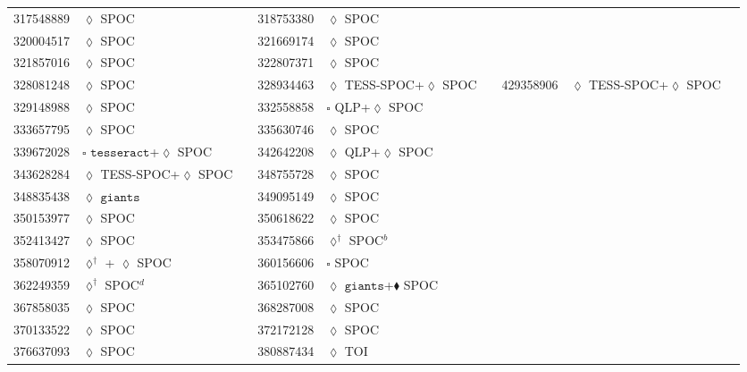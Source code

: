 \begin{longtable}{llrllr}
317548889 & $\lozenge$ SPOC & \cite{TIC_232540264} & 318753380 & $\lozenge$ SPOC & \cite{TIC_428699140} \\
320004517 & $\lozenge$ SPOC & \cite{TIC_320004517} & 321669174 & $\lozenge$ SPOC & \cite{TIC_126606859} \\
321857016 & $\lozenge$ SPOC & \cite{TIC_321857016} & 322807371 & $\lozenge$ SPOC & \cite{TIC_322807371} \\
328081248 & $\lozenge$ SPOC & \cite{TIC_159418353} & 328934463 & $\lozenge$ TESS-SPOC+$\lozenge$ SPOC & \cite{TIC_268532343} & 429358906 & $\lozenge$ TESS-SPOC+$\lozenge$ SPOC & \cite{TIC_343628284} \\
329148988 & $\lozenge$ SPOC & \cite{TIC_329148988} & 332558858 & $\square$ QLP+$\lozenge$ SPOC & \cite{TIC_332558858} \\
333657795 & $\lozenge$ SPOC & \cite{TIC_333657795} & 335630746 & $\lozenge$ SPOC & \cite{TIC_335630746} \\
339672028 & $\square$ $\texttt{tesseract}$+$\lozenge$ SPOC & \cite{TIC_66561343} & 342642208 & $\lozenge$ QLP+$\lozenge$ SPOC & \cite{TIC_393831507} \\
343628284 & $\lozenge$ TESS-SPOC+$\lozenge$ SPOC & \cite{TIC_343628284} & 348755728 & $\lozenge$ SPOC & \cite{TIC_348755728} \\
348835438 & $\lozenge$ $\texttt{giants}$ & \cite{TIC_348835438} & 349095149 & $\lozenge$ SPOC & \cite{TIC_349095149} \\
350153977 & $\lozenge$ SPOC & \cite{TIC_350153977} & 350618622 & $\lozenge$ SPOC & \cite{TIC_350618622} \\
352413427 & $\lozenge$ SPOC & \cite{TIC_232540264} & 353475866 & $\lozenge^\dagger$ SPOC$^b$ & \cite{TIC_10837041} \\
358070912 & $\lozenge^\dagger$ + $\lozenge$ SPOC & \cite{TIC_358070912} & 360156606 & $\square$ SPOC & \cite{TIC_360156606} \\
362249359 & $\lozenge^\dagger$ SPOC$^d$ & \cite{TIC_10837041} & 365102760 & $\lozenge$ $\texttt{giants}$+$\blacklozenge$ SPOC & \cite{TIC_365102760} \\
367858035 & $\lozenge$ SPOC & \cite{TIC_232540264} & 368287008 & $\lozenge$ SPOC & \cite{TIC_368287008} \\
370133522 & $\lozenge$ SPOC & \cite{TIC_103633434} & 372172128 & $\lozenge$ SPOC & \cite{TIC_372172128} \\
376637093 & $\lozenge$ SPOC & \cite{TIC_376637093} & 380887434 & $\lozenge$ TOI & \cite{TIC_154872375} \\

\end{longtable}
